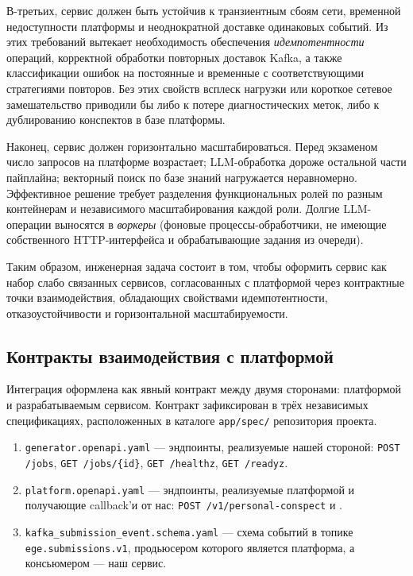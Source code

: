 \documentclass[a4paper,12pt]{extarticle}
\newcommand{\code}[1]{\texttt{\seqsplit{#1}}}
\begin{document}
В-третьих, сервис должен быть устойчив к транзиентным сбоям сети, временной недоступности
платформы и неоднократной доставке одинаковых событий. Из этих требований вытекает
необходимость обеспечения \textit{идемпотентности} операций, корректной обработки
повторных доставок Kafka, а также классификации ошибок на постоянные и временные с
соответствующими стратегиями повторов. Без этих свойств всплеск нагрузки или короткое
сетевое замешательство приводили бы либо к потере диагностических меток, либо к
дублированию конспектов в базе платформы.

Наконец, сервис должен горизонтально масштабироваться. Перед экзаменом число запросов
на платформе возрастает; LLM-обработка дороже остальной части пайплайна; векторный поиск
по базе знаний нагружается неравномерно. Эффективное решение требует разделения
функциональных ролей по разным контейнерам и независимого масштабирования каждой роли.
Долгие LLM-операции выносятся в \textit{воркеры} (фоновые процессы-обработчики,
не имеющие собственного HTTP-интерфейса и обрабатывающие задания из очереди).

Таким образом, инженерная задача состоит в том, чтобы оформить сервис как набор слабо
связанных сервисов, согласованных с платформой через контрактные точки взаимодействия,
обладающих свойствами идемпотентности, отказоустойчивости и горизонтальной
масштабируемости.

\subsection{Контракты взаимодействия с платформой}

Интеграция оформлена как явный контракт между двумя сторонами: платформой и
разрабатываемым сервисом. Контракт зафиксирован в трёх независимых спецификациях,
расположенных в каталоге \texttt{app/spec/} репозитория проекта.

\begin{enumerate}
    \item \texttt{generator.openapi.yaml} --- эндпоинты, реализуемые нашей стороной:
        \texttt{POST /jobs}, \texttt{GET /jobs/\{id\}}, \texttt{GET /healthz},
        \texttt{GET /readyz}.
    \item \texttt{platform.openapi.yaml} --- эндпоинты, реализуемые платформой и
        получающие callback'и от нас: \texttt{POST /v1/personal-conspect} и
        \code{POST /v1/submissions/\{id\}/diagnostic-tags}.
    \item \texttt{kafka\_submission\_event.schema.yaml} --- схема событий в топике
        \texttt{ege.submissions.v1}, продьюсером которого является платформа, а
        консьюмером --- наш сервис.
\end{enumerate}
\end{document}
